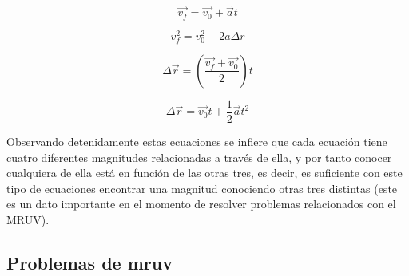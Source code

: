 \begin{equation}
\vec{v_f} = \vec{v_0} + \vec{a}t 
\end{equation}

\begin{equation}
 v_f^2 = v_0^2+2a\Delta r
\end{equation}

\begin{equation}
 \Delta \vec{r} = (\frac{\vec{v_f}+\vec{v_0}}{2})t
\end{equation}

\begin{equation}
 \Delta \vec{r} = \vec{v_0}t + \frac{1}{2}\vec{a}t^2
\end{equation}
 
Observando detenidamente estas ecuaciones se infiere que cada ecuación tiene cuatro diferentes magnitudes relacionadas 
a través de ella, y por tanto conocer cualquiera de ella está en función de las otras tres, es decir, es suficiente con 
este tipo de ecuaciones encontrar una magnitud conociendo otras tres distintas (este es un dato importante en el momento de 
resolver problemas relacionados con el MRUV).

\subsection{Problemas de mruv}

